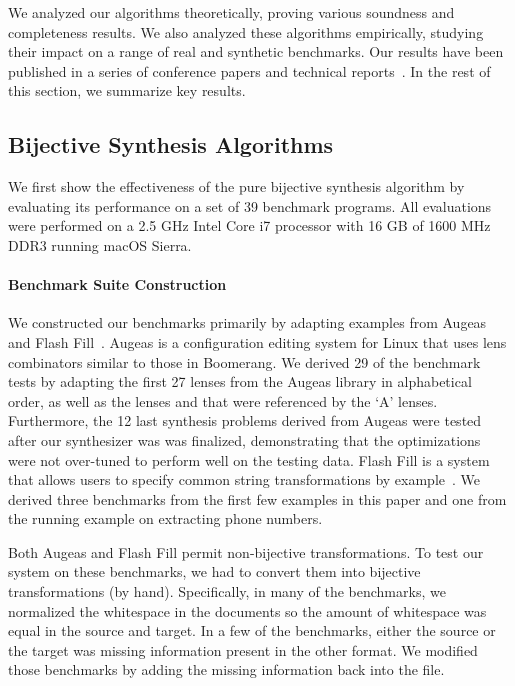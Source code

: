 \documentclass[12pt]{article}
\begin{document}
{We analyzed our algorithms theoretically, proving various soundness and
completeness results.  We also analyzed these algorithms empirically,
studying their impact on a range of real and synthetic benchmarks.  Our
results have been published in a series of conference papers and technical
reports~\cite{bijective-synthesis,quotient-synthesis,symmetric-synthesis}.
In the rest of this section, we summarize key results.

\subsection{Bijective Synthesis Algorithms}

We first show the effectiveness of the pure bijective synthesis
algorithm by evaluating its performance on a set of 39
benchmark programs.  
%
All evaluations were performed on a 2.5 GHz Intel Core i7 processor with 16 GB
of 1600 MHz DDR3 running macOS Sierra.

\paragraph*{Benchmark Suite Construction}
We constructed our benchmarks primarily by adapting examples from
Augeas~\cite{augeas} and 
Flash Fill~\cite{gulwani-popl-2014}.
%
Augeas is a configuration editing system for Linux that uses lens
combinators similar to those in Boomerang.  
We derived 29 of the benchmark tests by
adapting the first 27 lenses from the Augeas library in alphabetical order,
as well as the lenses 
 and  that were referenced
by the `A' lenses.
Furthermore, the 12 last synthesis problems derived
from Augeas were tested after our synthesizer was was
finalized, demonstrating that the optimizations were not
over-tuned to perform well on the testing data.
%
Flash Fill is a system that allows users to specify common string
transformations by example~\cite{gulwani-popl-2014}.  
We derived three benchmarks from the first few examples in this
paper and one from the running example on
extracting phone numbers.

Both Augeas and Flash Fill permit non-bijective transformations.
To test our system on these benchmarks, we had to convert them into
bijective transformations (by hand).  Specifically, in many of the
benchmarks, we normalized
the whitespace in the documents so the amount of whitespace was equal
in the source and target.  In a few of the benchmarks, either the
source or the target was missing information present in the other
format.  We modified those benchmarks by adding the missing
information back into the file. 

}
\end{document}
